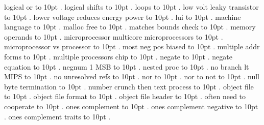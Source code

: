 \smallskip
logical or \leaders\hbox to 10pt {\hss.\hss}  \hfill {}
\smallskip
logical shifts \leaders\hbox to 10pt {\hss.\hss}  \hfill {}
\smallskip
loops \leaders\hbox to 10pt {\hss.\hss}  \hfill {}
\smallskip
low volt leaky transistor \leaders\hbox to 10pt {\hss.\hss}  \hfill {}
\smallskip
lower voltage reduces energy power \leaders\hbox to 10pt {\hss.\hss}  \hfill {}
\smallskip
lui \leaders\hbox to 10pt {\hss.\hss}  \hfill {}
\smallskip
machine language \leaders\hbox to 10pt {\hss.\hss}  \hfill {}
\smallskip
malloc free \leaders\hbox to 10pt {\hss.\hss}  \hfill {}
\smallskip
matches bounds check \leaders\hbox to 10pt {\hss.\hss}  \hfill {}
\smallskip
memory operands \leaders\hbox to 10pt {\hss.\hss}  \hfill {}
\smallskip
microprocessor multicore microprocessors \leaders\hbox to 10pt {\hss.\hss}  \hfill {}
\smallskip
microprocessor vs processor \leaders\hbox to 10pt {\hss.\hss}  \hfill {}
\smallskip
most neg pos biased \leaders\hbox to 10pt {\hss.\hss}  \hfill {}
\smallskip
multiple addr forms \leaders\hbox to 10pt {\hss.\hss}  \hfill {}
\smallskip
multiple processors chip \leaders\hbox to 10pt {\hss.\hss}  \hfill {}
\smallskip
negate \leaders\hbox to 10pt {\hss.\hss}  \hfill {}
\smallskip
negate equation \leaders\hbox to 10pt {\hss.\hss}  \hfill {}
\smallskip
negnum 1 MSB \leaders\hbox to 10pt {\hss.\hss}  \hfill {}
\smallskip
nested proc \leaders\hbox to 10pt {\hss.\hss}  \hfill {}
\smallskip
no branch lt MIPS \leaders\hbox to 10pt {\hss.\hss}  \hfill {}
\smallskip
no unresolved refs \leaders\hbox to 10pt {\hss.\hss}  \hfill {}
\smallskip
nor \leaders\hbox to 10pt {\hss.\hss}  \hfill {}
\smallskip
nor to not \leaders\hbox to 10pt {\hss.\hss}  \hfill {}
\smallskip
null byte termination \leaders\hbox to 10pt {\hss.\hss}  \hfill {}
\smallskip
number crunch then text process \leaders\hbox to 10pt {\hss.\hss}  \hfill {}
\smallskip
object file \leaders\hbox to 10pt {\hss.\hss}  \hfill {}
\smallskip
object file format \leaders\hbox to 10pt {\hss.\hss}  \hfill {}
\smallskip
object file header \leaders\hbox to 10pt {\hss.\hss}  \hfill {}
\smallskip
often need to cooperate \leaders\hbox to 10pt {\hss.\hss}  \hfill {}
\smallskip
ones complement \leaders\hbox to 10pt {\hss.\hss}  \hfill {}
\smallskip
ones complement negative \leaders\hbox to 10pt {\hss.\hss}  \hfill {}
\smallskip
ones complement traits \leaders\hbox to 10pt {\hss.\hss}  \hfill {}
